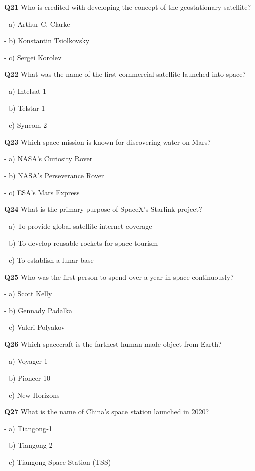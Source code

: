 \textbf{Q21} Who is credited with developing the concept of the geostationary satellite?\par
\quad - a) Arthur C. Clarke\par
\quad - b) Konstantin Tsiolkovsky\par
\quad - c) Sergei Korolev\par

\textbf{Q22} What was the name of the first commercial satellite launched into space?\par
\quad - a) Intelsat 1\par
\quad - b) Telstar 1\par
\quad - c) Syncom 2\par

\textbf{Q23} Which space mission is known for discovering water on Mars?\par
\quad - a) NASA's Curiosity Rover\par
\quad - b) NASA's Perseverance Rover\par
\quad - c) ESA's Mars Express\par

\textbf{Q24} What is the primary purpose of SpaceX's Starlink project?\par
\quad - a) To provide global satellite internet coverage\par
\quad - b) To develop reusable rockets for space tourism\par
\quad - c) To establish a lunar base\par

\textbf{Q25} Who was the first person to spend over a year in space continuously?\par
\quad - a) Scott Kelly\par
\quad - b) Gennady Padalka\par
\quad - c) Valeri Polyakov\par

\textbf{Q26} Which spacecraft is the farthest human‑made object from Earth?\par
\quad - a) Voyager 1\par
\quad - b) Pioneer 10\par
\quad - c) New Horizons\par

\textbf{Q27} What is the name of China's space station launched in 2020?\par
\quad - a) Tiangong‑1\par
\quad - b) Tiangong‑2\par
\quad - c) Tiangong Space Station (TSS)\par

